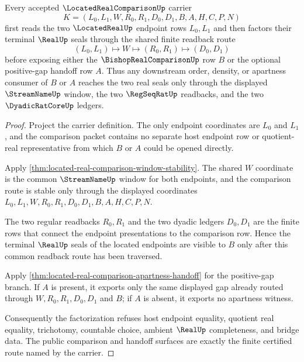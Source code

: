 \begin{theorem}
\label{thm:located-real-comparison-real-seal-factorization}
Every accepted $\LocatedRealComparisonUp$ carrier
$$
K=(L_0,L_1,W,R_0,R_1,D_0,D_1,B,A,H,C,P,N)
$$
first reads the two $\LocatedRealUp$ endpoint rows $L_0,L_1$ and then factors their terminal $\RealUp$ seals through the shared finite readback route
$$
(L_0,L_1)\longmapsto W\longmapsto(R_0,R_1)\longmapsto(D_0,D_1)
$$
before exposing either the $\BishopRealComparisonUp$ row $B$ or the optional positive-gap handoff row $A$. Thus any downstream order, density, or apartness consumer of $B$ or $A$ reaches the two real seals only through the displayed $\StreamNameUp$ window, the two $\RegSeqRatUp$ readbacks, and the two $\DyadicRatCoreUp$ ledgers.
\end{theorem}
\begin{proof}
Project the carrier definition. The only endpoint coordinates are $L_0$ and $L_1$, and the comparison packet contains no separate host endpoint row or quotient-real representative from which $B$ or $A$ could be opened directly.

Apply \autoref{thm:located-real-comparison-window-stability}. The shared $W$ coordinate is the common $\StreamNameUp$ window for both endpoints, and the comparison route is stable only through the displayed coordinates $L_0,L_1,W,R_0,R_1,D_0,D_1,B,A,H,C,P,N$.

The two regular readbacks $R_0,R_1$ and the two dyadic ledgers $D_0,D_1$ are the finite rows that connect the endpoint presentations to the comparison row. Hence the terminal $\RealUp$ seals of the located endpoints are visible to $B$ only after this common readback route has been traversed.

Apply \autoref{thm:located-real-comparison-apartness-handoff} for the positive-gap branch. If $A$ is present, it exports only the same displayed gap already routed through $W,R_0,R_1,D_0,D_1$ and $B$; if $A$ is absent, it exports no apartness witness.

Consequently the factorization refuses host endpoint equality, quotient real equality, trichotomy, countable choice, ambient $\RealUp$ completeness, and bridge data. The public comparison and handoff surfaces are exactly the finite certified route named by the carrier.
\end{proof}


